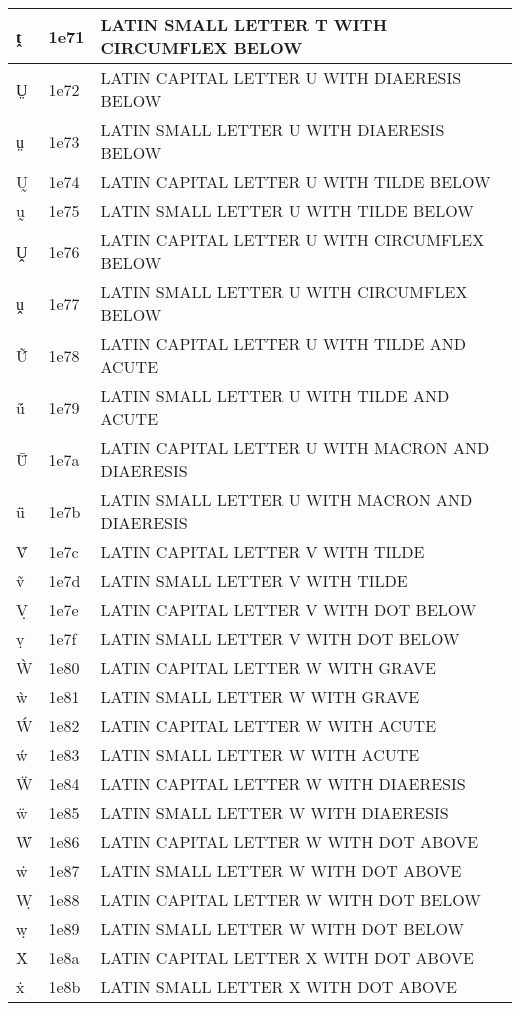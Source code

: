 \documentclass[12pt,letterpaper,openany]{book}
\begin{document}
\begin{center}
\begin{supertabular}{|m{0.25in}|m{0.5in}|m{4in}|}
ṱ & 1e71 & LATIN SMALL LETTER T WITH CIRCUMFLEX BELOW\\\hline
Ṳ & 1e72 & LATIN CAPITAL LETTER U WITH DIAERESIS BELOW\\\hline
ṳ & 1e73 & LATIN SMALL LETTER U WITH DIAERESIS BELOW\\\hline
Ṵ & 1e74 & LATIN CAPITAL LETTER U WITH TILDE BELOW\\\hline
ṵ & 1e75 & LATIN SMALL LETTER U WITH TILDE BELOW\\\hline
Ṷ & 1e76 & LATIN CAPITAL LETTER U WITH CIRCUMFLEX BELOW\\\hline
ṷ & 1e77 & LATIN SMALL LETTER U WITH CIRCUMFLEX BELOW\\\hline
Ṹ & 1e78 & LATIN CAPITAL LETTER U WITH TILDE AND ACUTE\\\hline
ṹ & 1e79 & LATIN SMALL LETTER U WITH TILDE AND ACUTE\\\hline
Ṻ & 1e7a & LATIN CAPITAL LETTER U WITH MACRON AND DIAERESIS\\\hline
ṻ & 1e7b & LATIN SMALL LETTER U WITH MACRON AND DIAERESIS\\\hline
Ṽ & 1e7c & LATIN CAPITAL LETTER V WITH TILDE\\\hline
ṽ & 1e7d & LATIN SMALL LETTER V WITH TILDE\\\hline
Ṿ & 1e7e & LATIN CAPITAL LETTER V WITH DOT BELOW\\\hline
ṿ & 1e7f & LATIN SMALL LETTER V WITH DOT BELOW\\\hline
Ẁ & 1e80 & LATIN CAPITAL LETTER W WITH GRAVE\\\hline
ẁ & 1e81 & LATIN SMALL LETTER W WITH GRAVE\\\hline
Ẃ & 1e82 & LATIN CAPITAL LETTER W WITH ACUTE\\\hline
ẃ & 1e83 & LATIN SMALL LETTER W WITH ACUTE\\\hline
Ẅ & 1e84 & LATIN CAPITAL LETTER W WITH DIAERESIS\\\hline
ẅ & 1e85 & LATIN SMALL LETTER W WITH DIAERESIS\\\hline
Ẇ & 1e86 & LATIN CAPITAL LETTER W WITH DOT ABOVE\\\hline
ẇ & 1e87 & LATIN SMALL LETTER W WITH DOT ABOVE\\\hline
Ẉ & 1e88 & LATIN CAPITAL LETTER W WITH DOT BELOW\\\hline
ẉ & 1e89 & LATIN SMALL LETTER W WITH DOT BELOW\\\hline
Ẋ & 1e8a & LATIN CAPITAL LETTER X WITH DOT ABOVE\\\hline
ẋ & 1e8b & LATIN SMALL LETTER X WITH DOT ABOVE\\\hline

\end{supertabular}
\end{center}
\end{document}

